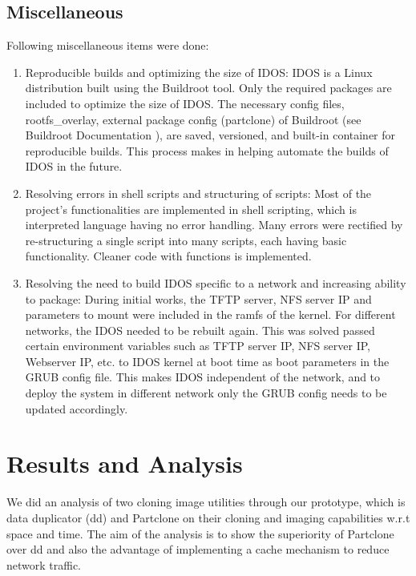 \documentclass[a4paper,12pt]{article}
\begin{document}
\subsection{ Miscellaneous}
Following miscellaneous items were done:
\begin{enumerate}
    \item Reproducible builds and optimizing the size of IDOS: IDOS is a Linux distribution built using the Buildroot tool. Only the required packages are included to optimize the size of IDOS. The necessary config files, rootfs\_overlay, external package config (partclone) of Buildroot (see Buildroot Documentation \cite{buildrootdoc}), are saved, versioned, and built-in container for reproducible builds. This process makes in helping automate the builds of IDOS in the future.
    \item Resolving errors in shell scripts and structuring of scripts: Most of the project's functionalities are implemented in shell scripting, which is interpreted language having no error handling. Many errors were rectified by re-structuring a single script into many scripts, each having basic functionality. Cleaner code with functions is implemented.
    \item Resolving the need to build IDOS specific to a network and increasing ability to package: During initial works, the TFTP server, NFS server IP and parameters to mount were included in the ramfs of the kernel. For different networks, the IDOS needed to be rebuilt again. This was solved passed certain environment variables such as TFTP server IP, NFS server IP, Webserver IP, etc. to IDOS kernel at boot time as boot parameters in the GRUB config file. This makes IDOS independent of the network, and to deploy the system in different network only the GRUB config needs to be updated accordingly.
\end{enumerate}
 \newpage
\section{\fontsize{16pt}{1em} Results and Analysis}
We did an analysis of two cloning image utilities through our prototype, which is data duplicator (dd) and Partclone on their cloning and imaging capabilities w.r.t space and time. The aim of the analysis is to show the superiority of Partclone over dd and also the advantage of implementing a cache mechanism to reduce network traffic.
\end{document}
